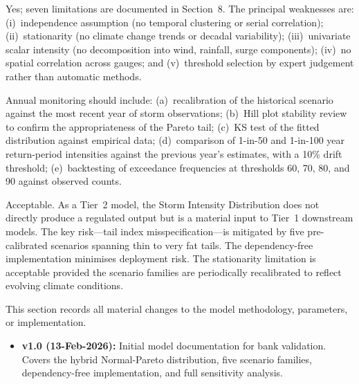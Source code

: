 \documentclass[11pt,a4paper]{article}
\begin{document}
Yes; seven limitations are documented in Section~8. The principal weaknesses are: (i)~independence assumption (no temporal clustering or serial correlation); (ii)~stationarity (no climate change trends or decadal variability); (iii)~univariate scalar intensity (no decomposition into wind, rainfall, surge components); (iv)~no spatial correlation across gauges; and (v)~threshold selection by expert judgement rather than automatic methods.

Annual monitoring should include: (a)~recalibration of the historical scenario against the most recent year of storm observations; (b)~Hill plot stability review to confirm the appropriateness of the Pareto tail; (c)~KS test of the fitted distribution against empirical data; (d)~comparison of 1-in-50 and 1-in-100 year return-period intensities against the previous year's estimates, with a 10\% drift threshold; (e)~backtesting of exceedance frequencies at thresholds 60, 70, 80, and 90 against observed counts.

Acceptable. As a Tier~2 model, the Storm Intensity Distribution does not directly produce a regulated output but is a material input to Tier~1 downstream models. The key risk---tail index misspecification---is mitigated by five pre-calibrated scenarios spanning thin to very fat tails. The dependency-free implementation minimises deployment risk. The stationarity limitation is acceptable provided the scenario families are periodically recalibrated to reflect evolving climate conditions.

\clearpage

\mkmchangelog

This section records all material changes to the model methodology, parameters,
or implementation.

\begin{itemize}[nosep]
    \item \textbf{v1.0 (13-Feb-2026):} Initial model documentation for bank
          validation. Covers the hybrid Normal-Pareto distribution, five scenario
          families, dependency-free implementation, and full sensitivity analysis.
\end{itemize}
\end{document}

